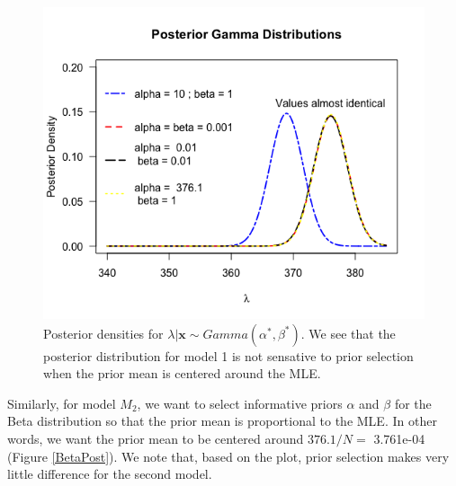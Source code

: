 \documentclass[a4paper, 9pt]{article}
\newcommand{\xbold}{ \pmb{x} }
\begin{document}
\begin{enumerate}
\begin{figure}[h!]
    \centering
    \includegraphics[scale = 0.6]{GammaPost.png}
    \captionsetup{width=.6\linewidth}
    \caption{Posterior densities for $\lambda|\xbold \sim Gamma(\alpha^*, \beta^*)$. We see that the posterior distribution for model 1 is not sensative to prior selection when the prior mean is centered around the MLE.}
    \label{GammaCompare}
\end{figure}

Similarly, for model $M_2$, we want to select informative priors $\alpha$ and $\beta$ for the Beta distribution so that the prior mean is proportional to the MLE. In other words, we want the prior mean to be centered around $376.1/N =$ {3.761e-04} (Figure \ref{BetaPost}). We note that, based on the plot, prior selection makes very little difference for the second model.


\end{enumerate}
\end{document}
